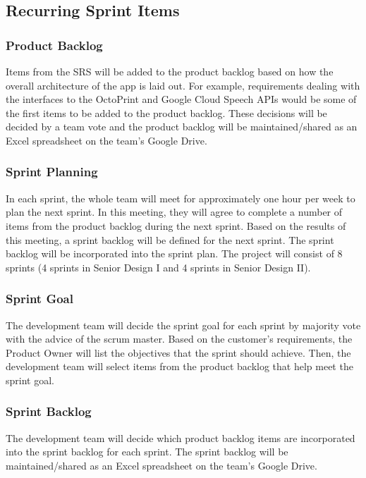 \subsection{Recurring Sprint Items}

\subsubsection{Product Backlog}
Items from the SRS will be added to the product backlog based on how the overall architecture of the app is laid out. For example, requirements dealing with the interfaces to the OctoPrint and Google Cloud Speech APIs would be some of the first items to be added to the product backlog. These decisions will be decided by a team vote and the product backlog will be maintained/shared as an Excel spreadsheet on the team's Google Drive.

\subsubsection{Sprint Planning}
In each sprint, the whole team will meet for approximately one hour per week to plan the next sprint. In this meeting, they will agree to complete a number of items from the product backlog during the next sprint. Based on the results of this meeting, a sprint backlog will be defined for the next sprint. The sprint backlog will be incorporated into the sprint plan. The project will consist of 8 sprints (4 sprints in Senior Design I and 4 sprints in Senior Design II).

\subsubsection{Sprint Goal}
The development team will decide the sprint goal for each sprint by majority vote with the advice of the scrum master. Based on the customer's requirements, the Product Owner will list the objectives that the sprint should achieve. Then, the development team will select items from the product backlog that help meet the sprint goal.\cite{Scrum2018}

\subsubsection{Sprint Backlog}
The development team will decide which product backlog items are incorporated into the sprint backlog for each sprint. The sprint backlog will be maintained/shared as an Excel spreadsheet on the team's Google Drive. 

